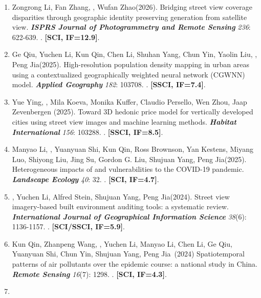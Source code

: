 \begin{enumerate}
\item
    Zongrong Li, Fan Zhang, \Shaoqing\CS, Wufan Zhao\CS (2026).
    Bridging street view coverage disparities through geographic identity preserving generation from satellite view.
    \textbf{\textit{ISPRS Journal of Photogrammetry and Remote Sensing}} \textit{236}: 622-639.
    . \textbf{[SCI, IF=12.9]}.
\item    
    Ge Qiu, Yuchen Li, Kun Qin, Chen Li, Shuhan Yang, Chun Yin, Yaolin Liu\CS, \Shaoqing\CS, Peng Jia\CS (2025).
    High-resolution population density mapping in urban areas using a contextualized geographically weighted neural network (CGWNN) model. 
    \textbf{\textit{Applied Geography}} \textit{182}: 103708.
    . \textbf{[SSCI, IF=7.4]}.
\item    
    Yue Ying, \Shaoqing\CS, Mila Koeva, Monika Kuffer, Claudio Persello, Wen Zhou, Jaap Zevenbergen (2025).
    Toward 3D hedonic price model for vertically developed cities using street view images and machine learning methods. 
    \textbf{\textit{Habitat International}} \textit{156}: 103288.
    . \textbf{[SSCI, IF=8.5]}.
\item    
    Manyao Li\CF, \Shaoqing\CF, Yuanyuan Shi\CF, Kun Qin\CF, Ross Brownson, Yan Kestens, Miyang Luo, Shiyong Liu, Jing Su, Gordon G. Liu, Shujuan Yang\CS, Peng Jia\CS (2025).
    Heterogeneous impacts of and vulnerabilities to the COVID-19 pandemic. 
    \textbf{\textit{Landscape Ecology}} \textit{40}: 32.
    . \textbf{[SCI, IF=4.7]}.
\item
    \Shaoqing, Yuchen Li, Alfred Stein, Shujuan Yang, Peng Jia\CS (2024).
    Street view imagery-based built environment auditing tools: a systematic review. 
    \textbf{\textit{International Journal of Geographical Information Science}} \textit{38}(6): 1136-1157.
    . \textbf{[SCI/SSCI, IF=5.9]}.
\item
    Kun Qin\CF, Zhanpeng Wang\CF, \Shaoqing\CF, Yuchen Li, Manyao Li, Chen Li, Ge Qiu, Yuanyuan Shi, Chun Yin, Shujuan Yang, Peng Jia\CS \ (2024)
    Spatiotemporal patterns of air pollutants over the epidemic course: a national study in China. 
    \textbf{\textit{Remote Sensing}} \textit{16}(7): 1298.
    . \textbf{[SCI, IF=4.3]}.
\item

\end{enumerate}
